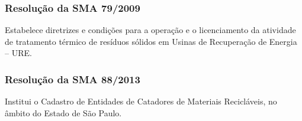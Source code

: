 \begin{subapend}
\begin{subsubapend}
		\subsubsection{Resolução da SMA 79/2009}
		Estabelece diretrizes e condições para a operação e o licenciamento da atividade de tratamento térmico de resíduos sólidos em Usinas de Recuperação de Energia – URE.
		\subsubsection{Resolução da SMA 88/2013}
		Institui o Cadastro de Entidades de Catadores de Materiais Recicláveis, no âmbito do Estado de São Paulo.
		
	\end{subsubapend}
\end{subapend}


